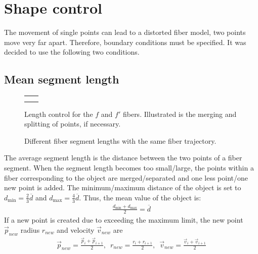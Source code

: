 \section{Shape control}\label{chap5:ShapeControl}
The movement of single points can lead to a distorted fiber model, \eg{} two points move very far apart.
Therefore, boundary conditions must be specified.
It was decided to use the following two conditions.
%
% 
% 
\subsection{Mean segment length}
%
\begin{figure}[!t]
    \centering
    \tikzset{external/export=false}
    \def\forcetikzscale{true}
    \setlength{\tabcolsep}{0pt}
    \setlength{\tikzwidth}{.45\textwidth}
    \begin{tabular}{C{.5\textwidth}C{.5\textwidth}}
     &
     \\
     &
    \end{tabular}
	\caption{Length control for the $f$ and $f'$ fibers. Illustrated is the merging and splitting of points, if necessary.}
	\label{fig:mergeSplit}
\end{figure}
%
%
\begin{figure}[!t]
    \centering
    \setlength{\tikzwidth}{0.75\textwidth}
	\caption{Different fiber segment lengths with the same fiber trajectory.}
	\label{fig:modelLength}
\end{figure}
%
The average segment length is the distance between the two points of a fiber segment.
When the segment length becomes too small/large, the points within a fiber corresponding to the object are merged/separated and one less point/one new point is added.
The minimum/maximum distance of the object is set to $d_{\min} = \frac{2}{3} \overline{d}$ and $d_{\max} = \frac{4}{3}\overline{d}$.
Thus, the mean value of the object is:
\begin{align}
\frac{d_{\min} + d_{\max}}{2} = \overline{d}
\end{align}
%
If a new point is created due to exceeding the maximum limit, the new point $\vec{p}_{new}$ radius $r_{new}$ and velocity $\vec{v}_{new}$ are
\begin{align}
\vec{p}_{new} = \frac{\vec{p}_{i} + \vec{p}_{i+1}}{2},\enspace
r_{new} = \frac{r_{i} + r_{i+1}}{2},\enspace
\vec{v}_{new} = \frac{\vec{v}_{i} + \vec{v}_{i+1}}{2}
\end{align}
%
% 
% 
